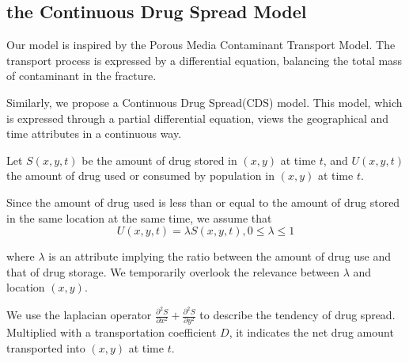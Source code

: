 \subsection{the Continuous Drug Spread Model}
Our model is inspired by the Porous Media Contaminant Transport Model.\cite{8} The transport process is expressed by a differential equation, balancing the total mass of contaminant in the fracture. 

Similarly, we propose a Continuous Drug Spread(CDS) model. This model, which is expressed through a partial differential equation, views the geographical and time attributes in a continuous way. 

Let $S(x,y,t)$ be the amount of drug stored in $(x,y)$ at time $t$, and $U(x,y,t)$ the amount of drug used or consumed by population in $(x,y)$ at time $t$.
\begin{comment}
, and $F(x,y,t)$ as the amount of drugs identified in $(x,y)$ at time $t$. We assume that the amount of identified drugs is directly proportional to the total amount of drugs with a proportionality constant $k$, such that

The NFLIS data contains drug identification counts in years 2010-2017 for narcotic analgesics and heroin in each of the counties from the five states stated in the problem background section. We denote this data as $F(x,y,t)$, the amount of drugs identified in $(x,y)$ at time $t$. 

\begin{equation}
S(x,y,t) = k F(x,y,t)
\end{equation}
\end{comment}
Since the amount of drug used is less than or equal to the amount of drug stored in the same location at the same time, we assume that
\begin{equation}
U(x,y,t) = \lambda S(x,y,t), 0\leq \lambda \leq 1
\end{equation}

where $\lambda$ is an attribute implying the ratio between the amount of drug use and that of drug storage. We temporarily overlook the relevance between $\lambda$ and location $(x,y)$.


We use the laplacian operator $\frac{\partial^2 S}{\partial x^2} + \frac{\partial^2 S}{\partial y^2}$ to describe the tendency of drug spread. Multiplied with a transportation coefficient $D$, it indicates the net drug amount transported into $(x,y)$ at time $t$.

